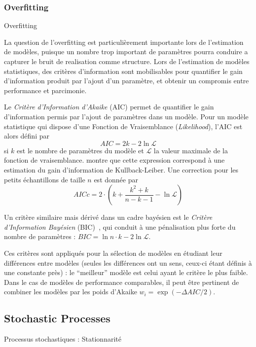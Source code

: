 \subsubsection*{Overfitting}{Overfitting}


La question de l'overfitting est particulièrement importante lors de l'estimation de modèles, puisque un nombre trop important de paramètres pourra conduire a capturer le bruit de realisation comme structure. Lors de l'estimation de modèles statistiques, des critères d'information sont mobilisables pour quantifier le gain d'information produit par l'ajout d'un paramètre, et obtenir un compromis entre performance et parcimonie.


Le \emph{Critère d'Information d'Akaike} (AIC) permet de quantifier le gain d'information permis par l'ajout de paramètres dans un modèle. Pour un modèle statistique qui dispose d'une Fonction de Vraisemblance (\emph{Likelihood}), l'AIC est alors défini par
\[
AIC = 2k - 2 \ln{\mathcal{L}}
\]
si $k$ est le nombre de paramètres du modèle et $\mathcal{L}$ la valeur maximale de la fonction de vraisemblance. \cite{akaike1998information} montre que cette expression correspond à une estimation du gain d'information de Kullback-Leiber. Une correction pour les petits échantillons de taille $n$ est donnée par
\[
AICc = 2\cdot\left(k + \frac{k^2 + k}{n-k -1} - \ln{\mathcal{L}}\right)
\]

Un critère similaire mais dérivé dans un cadre bayésien est le \emph{Critère d'Information Bayésien} (BIC)~\cite{burnham2003model}, qui conduit à une pénalisation plus forte du nombre de paramètres : $BIC = \ln n \cdot k - 2 \ln{\mathcal{L}}$.


Ces critères sont appliqués pour la sélection de modèles en étudiant leur différences entre modèles (seules les différences ont un sens, ceux-ci étant définis à une constante près) : le ``meilleur'' modèle est celui ayant le critère le plus faible. Dans le cas de modèles de performance comparables, il peut être pertinent de combiner les modèles par les poids d'Akaike $w_i = \exp (- \Delta AIC / 2)$.



\subsection*{Stochastic Processes}{Processus stochastiques : Stationnarité}


